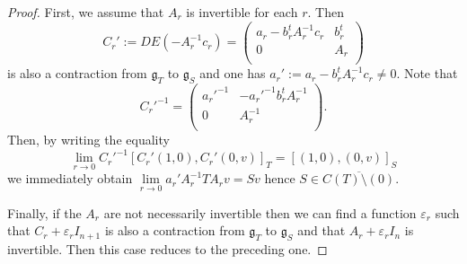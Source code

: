 \documentclass[
reqno]{amsart}
\begin{document}
\begin{proof}
First, we assume that $A_r$ is invertible for each $r$. Then 
$$C_r':=DE(-A_r^{-1}c_r)=\begin{pmatrix} 
a_r-b_r^tA_r^{-1}c_r& b_r^t \\
0 & A_r \\
\end{pmatrix}$$
is also a contraction from ${\mathfrak g}_T$ to ${\mathfrak g}_S$ and one has
$a_r':=a_r-b_r^tA_r^{-1}c_r\not= 0$. Note that
$$C_r'^{-1}=\begin{pmatrix} 
a_r'^{-1}& -a_r'^{-1}b_r^tA_r^{-1} \\
0 & A_r^{-1} \\
\end{pmatrix}.$$
Then, by writing the equality
$$\lim_{r\to 0}C_r'^{-1}[C_r'(1,0),C_r'(0,v)]_T=[(1,0),(0,v)]_S$$
we immediately obtain  $\lim\limits_{r\to 0}a_r'A_r^{-1}TA_rv=Sv$ hence  $S\in \overline {C(T)\setminus (0)}$.

Finally, if the $A_r$ are not necessarily invertible then we can find a function $\varepsilon_r$ such that $C_r+\varepsilon_rI_{n+1}$
is also a contraction from ${\mathfrak g}_T$ to ${\mathfrak g}_S$ and that $A_r+\varepsilon_rI_n$ is invertible. Then this case
reduces to the preceding one.
\end{proof}
\end{document}
